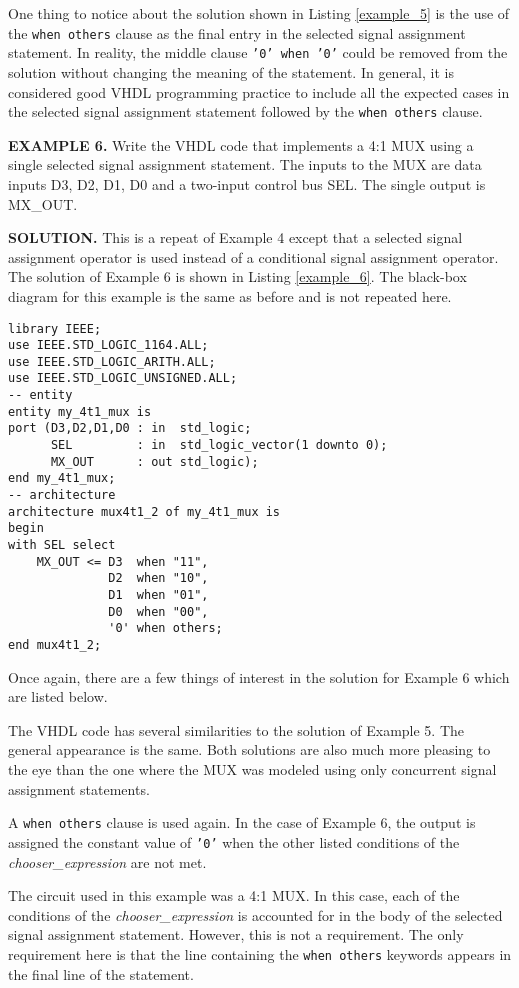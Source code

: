 One thing to notice about the solution shown in Listing \ref{example_5} is the use of the \texttt{when others} clause as the final entry in the selected signal assignment statement. In reality, the middle clause \texttt{'0' when '0'} could be removed from the solution without changing the meaning of the statement. In general, it is considered good VHDL programming practice to include all the expected cases in the selected signal assignment statement followed by the \texttt{when others} clause.
\begin{leftbar}
\noindent
\textbf{EXAMPLE 6.}
Write the VHDL code that implements a 4:1 MUX using a single selected signal assignment statement. The inputs to the MUX are data inputs D3, D2, D1, D0 and a two-input control bus SEL. The single output is MX\_OUT.
\end{leftbar}
\noindent
\textbf{SOLUTION.} This is a repeat of Example 4 except that a selected signal assignment operator is used instead of a conditional signal assignment operator. The solution of Example 6 is shown in Listing \ref{example_6}. The black-box diagram for this example is the same as before and is not repeated here.
\begin{lstlisting}[label=example_6, caption=Solution of Example 6.]
library IEEE;
use IEEE.STD_LOGIC_1164.ALL;
use IEEE.STD_LOGIC_ARITH.ALL;
use IEEE.STD_LOGIC_UNSIGNED.ALL;
-- entity
entity my_4t1_mux is
port (D3,D2,D1,D0 : in  std_logic;
      SEL         : in  std_logic_vector(1 downto 0);
      MX_OUT      : out std_logic);
end my_4t1_mux;
-- architecture
architecture mux4t1_2 of my_4t1_mux is
begin
with SEL select
	MX_OUT <= D3  when "11",
	          D2  when "10",
	          D1  when "01",
	          D0  when "00",
	          '0' when others;
end mux4t1_2;
\end{lstlisting}

Once again, there are a few things of interest in the solution for Example 6 which are listed below.
\begin{my_list}
\item The VHDL code has several similarities to the solution of Example 5. The general appearance is the same. Both solutions are also much more pleasing to the eye than the one where the MUX was modeled using only concurrent signal assignment statements.
\item A \texttt{when others} clause is used again. In the case of Example 6, the output is assigned the constant value of \texttt{'0'} when the other listed conditions of the \textit{chooser\_expression} are not met.
\item The circuit used in this example was a 4:1 MUX. In this case, each of the conditions of the \textit{chooser\_expression} is accounted for in the body of the selected signal assignment statement. However, this is not a requirement. The only requirement here is that the line containing the \texttt{when others} keywords appears in the final line of the statement.
\end{my_list}

